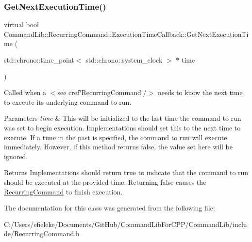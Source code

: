 \subsubsection{\texorpdfstring{Get\+Next\+Execution\+Time()}{GetNextExecutionTime()}}
{\footnotesize\ttfamily virtual bool Command\+Lib\+::\+Recurring\+Command\+::\+Execution\+Time\+Callback\+::\+Get\+Next\+Execution\+Time (\begin{DoxyParamCaption}\item[{std\+::chrono\+::time\+\_\+point$<$ std\+::chrono\+::system\+\_\+clock $>$ $\ast$}]{time }\end{DoxyParamCaption})\hspace{0.3cm}{\ttfamily [pure virtual]}}



Called when a $<$see cref\char`\"{}\+Recurring\+Command\char`\"{}/$>$ needs to know the next time to execute its underlying command to run. 


\begin{DoxyParams}{Parameters}
{\em time} & This will be initialized to the last time the command to run was set to begin execution. Implementations should set this to the next time to execute. If a time in the past is specified, the command to run will execute immediately. However, if this method returns false, the value set here will be ignored. \\
\hline
\end{DoxyParams}
\begin{DoxyReturn}{Returns}
Implementations should return true to indicate that the command to run should be executed at the provided time. Returning false causes the \mbox{\hyperlink{class_command_lib_1_1_recurring_command}{Recurring\+Command}} to finish execution. 
\end{DoxyReturn}


The documentation for this class was generated from the following file\+:\begin{DoxyCompactItemize}
\item 
C\+:/\+Users/efieleke/\+Documents/\+Git\+Hub/\+Command\+Lib\+For\+C\+P\+P/\+Command\+Lib/include/Recurring\+Command.\+h\end{DoxyCompactItemize}
